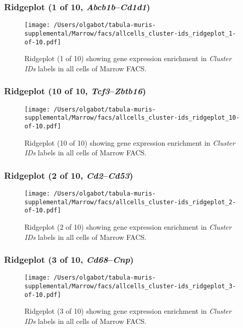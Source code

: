 \clearpage

\subsubsection{Ridgeplot (1 of 10, \emph{Abcb1b}--\emph{Cd1d1})}
\begin{figure}[h]
\centering
\texttt{[image: /Users/olgabot/tabula-muris-supplemental/Marrow/facs/allcells\_cluster-ids\_ridgeplot\_1-of-10.pdf]}

\caption{ Ridgeplot (1 of 10)  showing gene expression enrichment in \emph{Cluster IDs} labels in all cells of Marrow FACS. }
\end{figure}


\clearpage

\subsubsection{Ridgeplot (10 of 10, \emph{Tcf3}--\emph{Zbtb16})}
\begin{figure}[h]
\centering
\texttt{[image: /Users/olgabot/tabula-muris-supplemental/Marrow/facs/allcells\_cluster-ids\_ridgeplot\_10-of-10.pdf]}

\caption{ Ridgeplot (10 of 10)  showing gene expression enrichment in \emph{Cluster IDs} labels in all cells of Marrow FACS. }
\end{figure}


\clearpage

\subsubsection{Ridgeplot (2 of 10, \emph{Cd2}--\emph{Cd53})}
\begin{figure}[h]
\centering
\texttt{[image: /Users/olgabot/tabula-muris-supplemental/Marrow/facs/allcells\_cluster-ids\_ridgeplot\_2-of-10.pdf]}

\caption{ Ridgeplot (2 of 10)  showing gene expression enrichment in \emph{Cluster IDs} labels in all cells of Marrow FACS. }
\end{figure}


\clearpage

\subsubsection{Ridgeplot (3 of 10, \emph{Cd68}--\emph{Cnp})}
\begin{figure}[h]
\centering
\texttt{[image: /Users/olgabot/tabula-muris-supplemental/Marrow/facs/allcells\_cluster-ids\_ridgeplot\_3-of-10.pdf]}

\caption{ Ridgeplot (3 of 10)  showing gene expression enrichment in \emph{Cluster IDs} labels in all cells of Marrow FACS. }
\end{figure}


